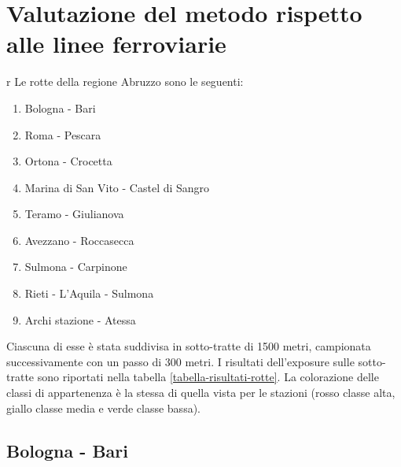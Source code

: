 
\chapter{Valutazione del metodo rispetto alle linee ferroviarie} r
Le rotte della regione Abruzzo sono le seguenti:
\begin{enumerate}
	\item Bologna - Bari
	\item Roma - Pescara
	\item Ortona - Crocetta
	\item Marina di San Vito - Castel di Sangro
	\item Teramo - Giulianova
	\item Avezzano - Roccasecca
	\item Sulmona - Carpinone
	\item Rieti - L'Aquila - Sulmona
	\item Archi stazione - Atessa
\end{enumerate}
Ciascuna di esse è stata suddivisa in sotto-tratte di 1500 metri, campionata successivamente con un passo di 300 metri. 
I risultati dell'exposure sulle sotto-tratte sono riportati nella tabella \ref{tabella-risultati-rotte}. La colorazione delle classi di appartenenza è la stessa di quella vista per le stazioni (rosso classe alta, giallo classe media e verde classe bassa).

\section{Bologna - Bari}

